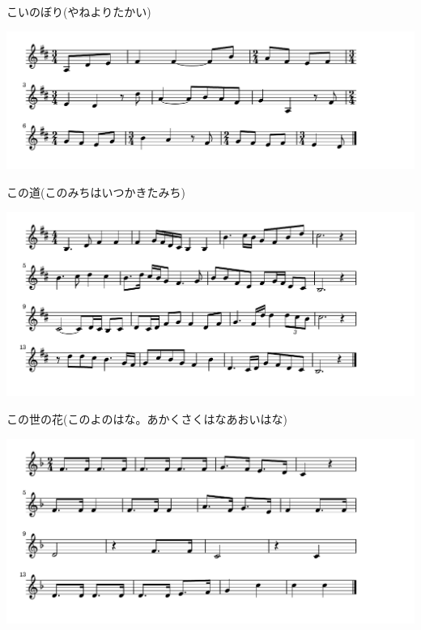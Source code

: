 \documentclass[a4paper]{ltjsarticle}
\begin{document}
\vspace{-10mm} \hspace{10mm}
こいのぼり(やねよりたかい)



\includegraphics[clip]{konomichi_crop.pdf}

\vspace{-10mm} \hspace{10mm}
この道(このみちはいつかきたみち)



\includegraphics[clip]{konoyonohana_crop.pdf}

\vspace{-10mm} \hspace{10mm}
この世の花(このよのはな。あかくさくはなあおいはな)



\includegraphics[clip]{mickeymousemarch_crop.pdf}
\end{document}
